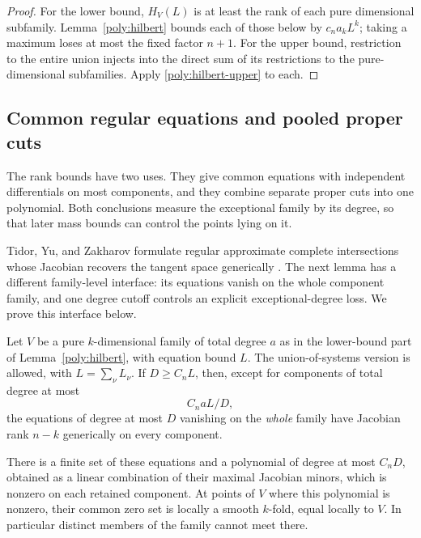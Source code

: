 \begin{proof}
For the lower bound, $H_V(L)$ is at least the rank of each pure
dimensional subfamily.  Lemma~\ref{poly:hilbert} bounds each of those
below by $c_na_kL^k$; taking a maximum loses at most the fixed factor
$n+1$.  For the upper bound, restriction to the entire union injects
into the direct sum of its restrictions to the pure-dimensional
subfamilies.  Apply \eqref{poly:hilbert-upper} to each.
\end{proof}

\subsection{Common regular equations and pooled proper cuts}

The rank bounds have two uses.  They give common equations with
independent differentials on most components, and they combine separate
proper cuts into one polynomial.  Both conclusions measure the exceptional
family by its degree, so that later mass bounds can control the points
lying on it.

Tidor, Yu, and Zakharov formulate regular approximate complete
intersections whose Jacobian recovers the tangent space generically
\cite[Theorem~4.1]{tidoryuzakharov2026}.  The next lemma has a different
family-level interface: its equations vanish on the whole component
family, and one degree cutoff controls an explicit exceptional-degree
loss.  We prove this interface below.

\begin{lemma}
\label{poly:regularity}
Let $V$ be a pure $k$-dimensional family of total degree $a$ as in the
lower-bound part of Lemma~\ref{poly:hilbert}, with equation bound $L$.
The union-of-systems version is allowed, with $L=\sum_\nu L_\nu$.
If $D\ge C_nL$, then, except for components of total degree at most
\begin{equation}\label{poly:regularity-loss}
 C_n aL/D,
\end{equation}
the equations of degree at most $D$ vanishing on the \emph{whole}
family have Jacobian rank $n-k$ generically on every component.

There is a finite set of these equations and a polynomial of degree
at most $C_nD$, obtained as a linear combination of their maximal
Jacobian minors, which is nonzero on each retained component.  At
points of $V$ where this polynomial is nonzero, their common zero
set is locally a smooth $k$-fold, equal locally to $V$.  In
particular distinct members of the family cannot meet there.
\end{lemma}

